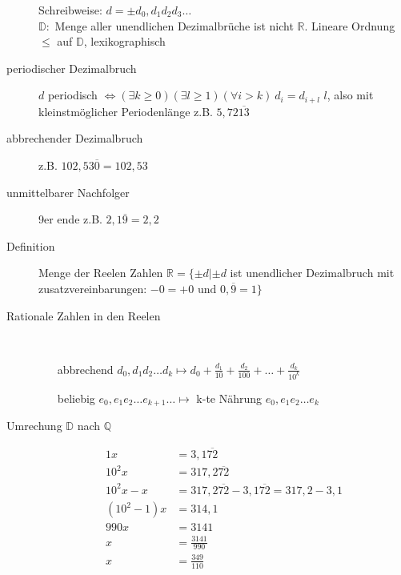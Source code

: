 \documentclass[12pt,a4paper]{article}
\begin{document}
\begin{description}
\begin{itemize}
		\end{itemize}
		Schreibweise: $d = \pm d_0,d_1d_2d_3\dots$\\
		$\mathbb{D} :$ Menge aller unendlichen Dezimalbrüche ist nicht $\mathbb{R}$. Lineare Ordnung $\leq$ auf $\mathbb{D}$, lexikographisch
	\item[periodischer Dezimalbruch] $d$ periodisch
		$\Leftrightarrow (\exists k \geq 0)(\exists l \geq 1) (\forall i > k)\ d_i= d_{i + l}$ $l$, also mit kleinstmöglicher Periodenlänge z.B. $5{,}72\overline{13}$
	\item[abbrechender Dezimalbruch] z.B. $102{,}53\overline{0} = 102{,}53$
	\item[unmittelbarer Nachfolger] 9er ende z.B. $2{,}1\overline{9} = 2{,}2$
	\item[Definition] Menge der Reelen Zahlen $\mathbb{R} = \lbrace \pm d | \pm d $ ist unendlicher Dezimalbruch mit zusatzvereinbarungen: $ -0 = +0 \textrm{ und } 0{,}\overline{9} = 1 \rbrace$
	\item[Rationale Zahlen in den Reelen] \
		\begin{itemize}
			\item[abbrechend] $d_0{,}d_1 d_2 \dots d_k \longmapsto d_0 + \frac{d_1}{10}+\frac{d_2}{100} + \dots + \frac{d_k}{10^k}$
			\item[beliebig] $e_0{,}e_1 e_2 \dots e_{k + 1} \dots \longmapsto$ k-te Nährung $e_0{,}e_1 e_2 \dots e_k$
		\end{itemize}
	\item[Umrechung $\mathbb{D}$ nach $\mathbb{Q}$]
		\begin{alignat*}{1}
			x         & = 3{,}1\overline{72}                                          \\
			10^2x     & = 317{,}2\overline{72}                                        \\
			10^2x-x   & = 317{,}2\overline{72} - 3{,}1\overline{72} = 317{,}2 - 3{,}1 \\
			(10^2-1)x & = 314{,}1                                                     \\
			990x      & = 3141                                                        \\
			x         & = \frac{3141}{990}                                            \\
			x         & = \frac{349}{110}                                             \\
		\end{alignat*}

\end{description}
\end{document}
